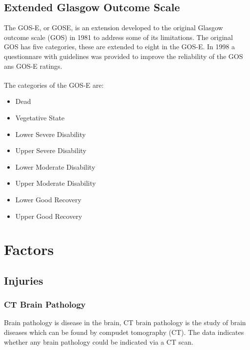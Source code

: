\documentclass[11pt]{article}
\begin{document}
\subsection{Extended Glasgow Outcome Scale}
The GOS-E, or GOSE, is an extension developed to the original Glasgow outcome scale (GOS) in 1981 to address some of its limitations. The original GOS has five categories, these are extended to eight in the GOS-E. In 1998 a questionnare with guidelines was provided to improve the reliability of the GOS ans GOS-E ratings\cite{GOSEExtendedGlasgow}.\cite{ExtendedGlasgowOutcome}\\
\\
The categories of the GOS-E are:
\begin{itemize}
  \item{Dead}
  \item{Vegetative State}
  \item{Lower Severe Disability}
  \item{Upper Severe Disability}
  \item{Lower Moderate Disability}
  \item{Upper Moderate Disability}
  \item{Lower Good Recovery}
  \item{Upper Good Recovery}
\end{itemize}



\section{Factors}

\subsection{Injuries}

\subsubsection{CT Brain Pathology}
Brain pathology is disease in the brain, CT brain pathology is the study of brain diseases which can be found by compudet tomography (CT).
The data indicates whether any brain pathology could be indicated via a CT scan.
\end{document}
